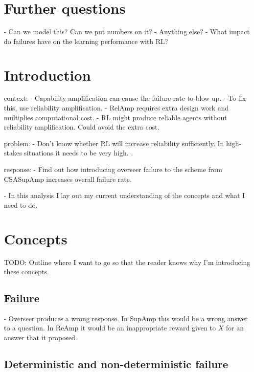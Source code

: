 \documentclass{farlamp}
\begin{document}
\section{Further questions}

- Can we model this? Can we put numbers on it?
- Anything else?
    - What impact do failures have on the learning performance with RL?


\section{Introduction}

context:
- Capability amplification can cause the failure rate to blow up.
- To fix this, use reliability amplification.
- RelAmp requires extra design work and multiplies computational cost.
- RL might produce reliable agents without reliability amplification. Could
avoid the extra cost.

problem:
- Don't know whether RL will increase reliability sufficiently. In high-stakes
situations it needs to be very high. \cite[Cf.][]{ChriLearnCata}.

response:
- Find out how introducing overseer failure to the scheme from CSASupAmp
increases overall failure rate.

- In this analysis I lay out my current understanding of the concepts and what I
need to do.


\section{Concepts}

TODO: Outline where I want to go so that the reader knows why I'm introducing
these concepts.


\subsection{Failure}

- Overseer produces a wrong response. In SupAmp this would be a wrong answer to
a question. In ReAmp it would be an inappropriate reward given to $X$ for an
answer that it proposed.


\subsection{Deterministic and non-deterministic failure}
\end{document}
